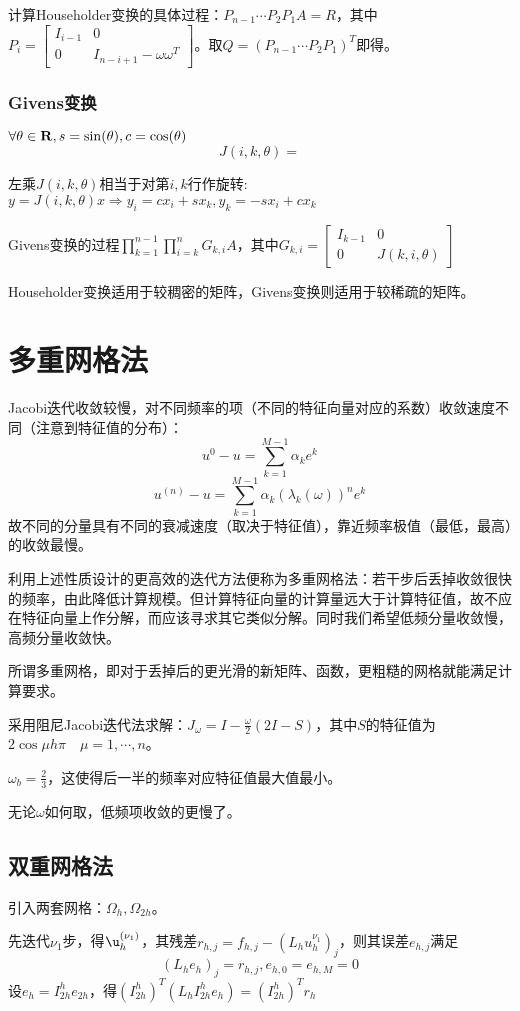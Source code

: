 \documentclass{ctexart}
\begin{document}
计算Householder变换的具体过程：$P_{n-1}\cdots P_2P_1A=R$，其中$P_i=\begin{bmatrix}I_{i-1}&0\\0& I_{n-i+1}-\omega\omega^T\end{bmatrix}$。取$Q=(P_{n-1}\cdots P_2P_1)^T$即得。

\subsubsection{Givens变换}
\begin{Def}
$\forall\theta\in \mathbf{R},s=\sin(\theta),c=\cos(\theta)$
\[J(i,k,\theta)=\]
\end{Def}
左乘$J(i,k,\theta)$相当于对第$i,k$行作旋转:$y=J(i,k,\theta)x\Rightarrow y_i=cx_i+sx_k, y_k=-sx_i+cx_k$

Givens变换的过程$\prod_{k=1}^{n-1}\prod_{i=k}^{n}G_{k,i}A$，其中$G_{k,i}=\begin{bmatrix}I_{k-1}&0\\0&J(k,i,\theta)\end{bmatrix}$

Householder变换适用于较稠密的矩阵，Givens变换则适用于较稀疏的矩阵。


\section{多重网格法}
Jacobi迭代收敛较慢，对不同频率的项（不同的特征向量对应的系数）收敛速度不同（注意到特征值的分布）：
\[u^{0}-u=\sum_{k=1}^{M-1}\alpha_ke^k\]
\[u^{(n)}-u=\sum_{k=1}^{M-1}\alpha_k(\lambda_k(\omega))^n e^k\]
故不同的分量具有不同的衰减速度（取决于特征值），靠近频率极值（最低，最高）的收敛最慢。

利用上述性质设计的更高效的迭代方法便称为多重网格法：若干步后丢掉收敛很快的频率，由此降低计算规模。但计算特征向量的计算量远大于计算特征值，故不应在特征向量上作分解，而应该寻求其它类似分解。同时我们希望低频分量收敛慢，高频分量收敛快。

所谓多重网格，即对于丢掉后的更光滑的新矩阵、函数，更粗糙的网格就能满足计算要求。

采用阻尼Jacobi迭代法求解：$J_\omega=I-\frac{\omega}{2}(2I-S)$，其中$S$的特征值为$2\cos\mu h\pi\quad \mu=1,\cdots,n$。


$\omega_b=\frac{2}{3}$，这使得后一半的频率对应特征值最大值最小。

无论$\omega$如何取，低频项收敛的更慢了。

\subsection{双重网格法}
引入两套网格：$\Omega_h,\Omega_{2h}$。

先迭代$\nu_1$步，得$\u_h^{(\nu_1)}$，其残差$r_{h,j}=f_{h,j}-(L_h u_h^{\nu_1})_j$，则其误差$e_{h,j}$满足
\[(L_he_h)_j=r_{h,j},e_{h,0}=e_{h,M}=0\]
设$e_h=I^h_{2h}e_{2h}$，得$(I^h_{2h})^T(L_hI^h_{2h}e_h)=(I^h_{2h})^T r_h$
\end{document}
